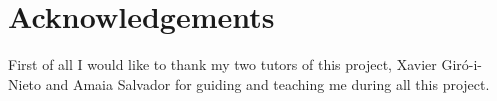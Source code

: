 \chapter*{Acknowledgements}
First of all I would like to thank my two tutors of this project, Xavier Giró-i-Nieto and Amaia
Salvador for guiding and teaching me during all this project.
